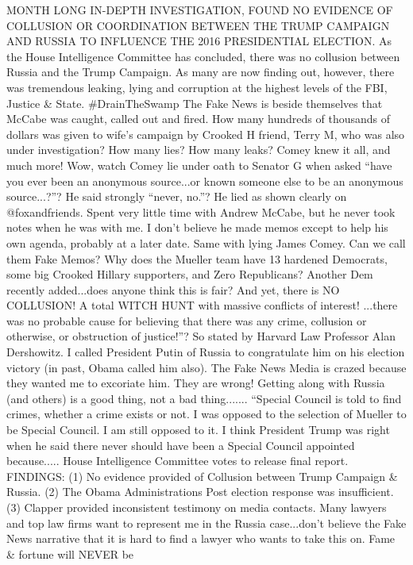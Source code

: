 MONTH LONG IN-DEPTH INVESTIGATION, FOUND NO EVIDENCE OF COLLUSION OR
COORDINATION BETWEEN THE TRUMP CAMPAIGN AND RUSSIA TO INFLUENCE THE 2016
PRESIDENTIAL ELECTION. As the House Intelligence Committee has
concluded, there was no collusion between Russia and the Trump Campaign.
As many are now finding out, however, there was tremendous leaking,
lying and corruption at the highest levels of the FBI, Justice \& State.
\#DrainTheSwamp The Fake News is beside themselves that McCabe was
caught, called out and fired. How many hundreds of thousands of dollars
was given to wife's campaign by Crooked H friend, Terry M, who was also
under investigation? How many lies? How many leaks? Comey knew it all,
and much more! Wow, watch Comey lie under oath to Senator G when asked
``have you ever been an anonymous source...or known someone else to be
an anonymous source...?''? He said strongly ``never, no.''? He lied as
shown clearly on @foxandfriends. Spent very little time with Andrew
McCabe, but he never took notes when he was with me. I don't believe he
made memos except to help his own agenda, probably at a later date. Same
with lying James Comey. Can we call them Fake Memos? Why does the
Mueller team have 13 hardened Democrats, some big Crooked Hillary
supporters, and Zero Republicans? Another Dem recently added...does
anyone think this is fair? And yet, there is NO COLLUSION! A total WITCH
HUNT with massive conflicts of interest! ...there was no probable cause
for believing that there was any crime, collusion or otherwise, or
obstruction of justice!''? So stated by Harvard Law Professor Alan
Dershowitz. I called President Putin of Russia to congratulate him on
his election victory (in past, Obama called him also). The Fake News
Media is crazed because they wanted me to excoriate him. They are wrong!
Getting along with Russia (and others) is a good thing, not a bad
thing....... ``Special Council is told to find crimes, whether a crime
exists or not. I was opposed to the selection of Mueller to be Special
Council. I am still opposed to it. I think President Trump was right
when he said there never should have been a Special Council appointed
because..... House Intelligence Committee votes to release final report.
FINDINGS: (1) No evidence provided of Collusion between Trump Campaign
\& Russia. (2) The Obama Administrations Post election response was
insufficient. (3) Clapper provided inconsistent testimony on media
contacts. Many lawyers and top law firms want to represent me in the
Russia case...don't believe the Fake News narrative that it is hard to
find a lawyer who wants to take this on. Fame \& fortune will NEVER be
